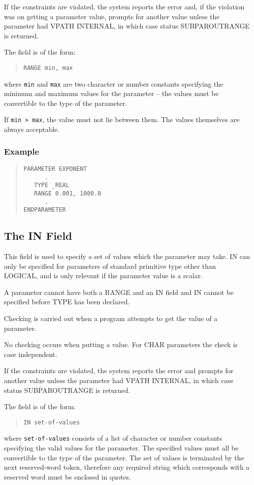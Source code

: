 \documentclass[twoside,11pt]{article}
\newcommand{\xlabel}[1]{}
\renewcommand{\_}{\texttt{\symbol{95}}}
\begin{document}
If the constraints are violated, the system reports the error and, if the
violation was on getting a parameter value, prompts for
another value unless the parameter had VPATH INTERNAL, in which case status
SUBPAR\_\_OUTRANGE is returned.

The field is of the form:
\begin{quote} \begin{verbatim}
RANGE min, max
\end{verbatim} \end{quote}
where \texttt{min} and \texttt{max} are two character or number
constants specifying the minimum and maximum values for the parameter -- the
values must be convertible to the type of the parameter.

If \texttt{min > max}, the value must not lie between them. The values themselves
are always acceptable.

\subsubsection*{Example}
\begin{quote} \begin{verbatim}
PARAMETER EXPONENT
      .
   TYPE _REAL
   RANGE 0.001, 1000.0
      .
ENDPARAMETER
\end{verbatim} \end{quote}

\subsection{The IN Field\xlabel{the_in_field}}

This field is used to specify a set of values which the parameter may take.
IN can only be specified for parameters of standard primitive type other
than \_LOGICAL, and is only relevant if the parameter value is a scalar.

A parameter cannot have both a RANGE and an IN field and IN cannot be specified
before TYPE has been declared.

Checking is carried out when a program attempts to get the value of a
parameter.

No checking occurs when putting a value.
For \_CHAR parameters the check is case independent.

If the constraints are violated, the system reports the error and prompts for
another value unless the parameter had VPATH INTERNAL, in which case status
SUBPAR\_\_OUTRANGE is returned.

The field is of the form:
\begin{quote} \begin{verbatim}
IN set-of-values
\end{verbatim} \end{quote}
where \texttt{set-of-values} consists of a list of character or number
constants specifying the valid values for the parameter.
The specified values must all be convertible to the type of the parameter.
The set of values is terminated by the next reserved-word token, therefore
any required string which corresponds with a reserved word must be enclosed in
quotes.
\end{document}
